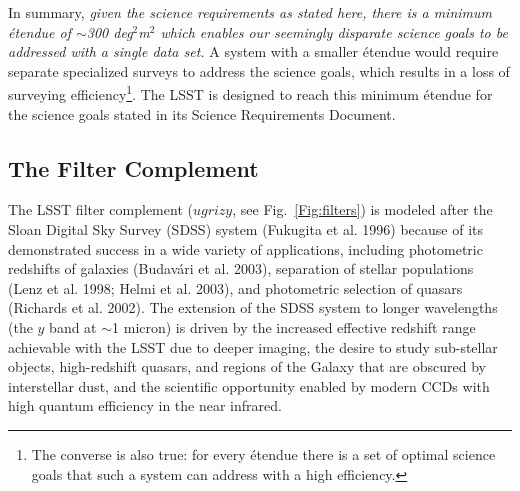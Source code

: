 \documentclass{emulateapj}
\begin{document}
In summary,
{\it given the science requirements as stated here, there is a
minimum \'etendue of $\sim$300 deg$^2$m$^2$ which enables our seemingly
disparate science goals to be addressed with a single data set.}
A system with a smaller \'etendue would require separate specialized surveys
to address the science goals, which results in a loss of surveying
efficiency\footnote{The converse is also true: for every \'etendue
there is a set of optimal science goals that such a system can 
address with a high efficiency.}. The LSST is designed to reach this 
minimum \'etendue for the science goals stated in its Science Requirements 
Document. 



\subsection{  The Filter Complement }

The LSST filter complement ($ugrizy$, see Fig.~\ref{Fig:filters}) is modeled after the Sloan
Digital Sky Survey 
(SDSS) system (Fukugita et al. 1996) because of its demonstrated success in a wide
variety of applications, including photometric redshifts of galaxies (Budav\'{a}ri
et al. 2003), separation of stellar populations (Lenz et al. 1998; Helmi et al. 2003), 
and photometric selection of quasars (Richards et al. 2002). The extension of the 
SDSS system to longer wavelengths
(the $y$ band at $\sim$1 micron) is driven by the increased effective redshift 
range achievable with the LSST due to deeper imaging, the desire to study sub-stellar 
objects, high-redshift quasars, and regions of the Galaxy that are obscured by
interstellar dust, and
the scientific opportunity enabled by modern CCDs with high quantum efficiency 
in the near infrared.  
\end{document}
